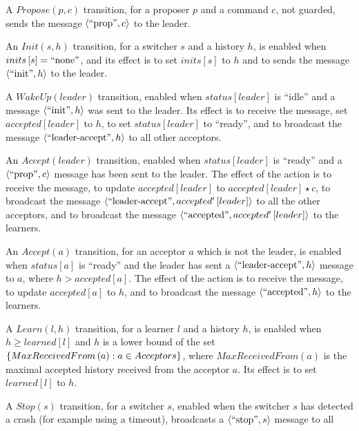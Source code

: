 \begin{compactitem}
\item A $Propose\left( p,c \right)$ transition, for a proposer $p$
  and a command $c$, not guarded, sends the message $\left\langle\text{``prop''},c\right\rangle$ to
  the leader.
\item An $Init\left( s, h \right)$ transition, for a switcher $s$
  and a history $h$, is enabled when $inits\left[ s \right] = \text{``none''}$, and its effect is to set $inits\left[ s \right]$ to $h$ and
  to sends the message $\left\langle\text{``init''},h\right\rangle$ to the leader.
\item A $WakeUp\left( leader \right)$ transition, enabled when
  $status\left[ leader \right]$ is ``idle'' and 
  a message $\left\langle\text{``init''},h\right\rangle$ was sent to the leader. Its effect is to
  receive the message, set $accepted\left[ leader \right]$ to $h$,
  to set $status\left[ leader \right]$ to ``ready'', and to
  broadcast the message $\left\langle\text{``leader-accept''},h\right\rangle$ to all
  other acceptors.
\item An $Accept\left( leader \right)$ transition, enabled when
  $status\left[ leader \right]$ is ``ready'' and a $\left\langle\text{``prop''},c\right\rangle$ message has been sent to the leader. The effect of the
  action is to receive the message, to update $accepted\left[ leader
  \right]$ to $accepted\left[ leader \right]\star c$,  to broadcast the message
  $\left\langle\text{``leader-accept''},accepted'\left[ leader \right]\right\rangle$
  to all the other acceptors, and to
  broadcast the message $\left\langle\text{``accepted''},accepted'\left[ leader
  \right]\right\rangle$ to the learners.
\item An $Accept\left( a \right)$ transition, for an acceptor $a$
  which is not the leader, is enabled when $status\left[ a
  \right]$ is ``ready'' and the leader has sent a
  $\left\langle\text{``leader-accept''},h\right\rangle$ message to $a$, where $h > accepted\left[ a
  \right]$. The effect of the action is to receive the message,
  to update $accepted\left[ a \right]$ to $h$, and to broadcast the
  message $\left\langle\text{``accepted''},h\right\rangle$ to the
  learners.
\item A $Learn\left( l, h \right)$ transition, for a learner $l$
  and a history $h$, is enabled when $h \geq learned\left[ l \right]$ and $h$ is a lower
  bound of the set $\left\{MaxReceivedFrom\left( a \right) : a \in Acceptors\right\}$, where $MaxReceivedFrom\left( a \right)$ is the maximal accepted history received
  from the acceptor $a$.  Its effect is to set $learned\left[ l \right]$ to $h$.
\item A $Stop\left( s \right)$ transition, for a switcher $s$,
  enabled when the switcher $s$ has detected a crash (for example using a timeout), broadcasts a $\left\langle\text{``stop''}, s\right\rangle$ message to all

\end{compactitem}
